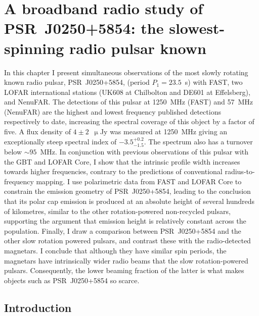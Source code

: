 \chapter[A broadband radio study of PSR~J0250+5854]{A broadband radio study of PSR~J0250+5854: the slowest-spinning radio pulsar known}
\label{chapt: J0250}

In this chapter I present simultaneous observations of the most slowly rotating known radio pulsar, PSR~J0250+5854, (period $P_1 = 23.5$~s) with FAST, two LOFAR international stations (UK608 at Chilbolton and DE601 at Effelsberg), and NenuFAR. The detections of this pulsar at 1250~MHz (FAST) and 57~MHz (NenuFAR) are the highest and lowest frequency published detections respectively to date, increasing the spectral coverage of this object by a factor of five. A flux density of $4\pm2$~$\upmu$Jy was measured at 1250~MHz giving an exceptionally steep spectral index of $-3.5^{+0.2}_{-1.5}$. The spectrum also has a turnover below $\sim95$~MHz. In conjunction with previous observations of this pulsar with the GBT and LOFAR Core, I show that the intrinsic profile width increases towards higher frequencies, contrary to the predictions of conventional radius-to-frequency mapping. I use polarimetric data from FAST and LOFAR Core to constrain the emission geometry of PSR~J0250+5854, leading to the conclusion that its polar cap emission is produced at an absolute height of several hundreds of kilometres, similar to the other rotation-powered non-recycled pulsars, supporting the argument that emission height is relatively constant across the population. Finally, I draw a comparison between PSR~J0250+5854 and the other slow rotation powered pulsars,  and contrast these with the radio-detected magnetars. I conclude that although they have similar spin periods, the magnetars have intrinsically wider radio beams that the slow rotation-powered pulsars. Consequently, the lower beaming fraction of the latter is what makes objects such as PSR~J0250+5854 so scarce.

\section{Introduction}
\label{sec: J0250 - introduction}


